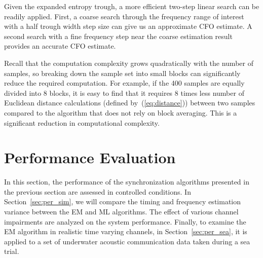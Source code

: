 \documentclass[journal,comsoc, onecolumn, 12pt,draftclsnofoot]{IEEEtran} %
\begin{document}
Given the expanded entropy trough, a more efficient two-step linear search can be readily applied.
First, a coarse search through the frequency range of interest with a half trough width step size can give us an approximate CFO estimate.
A second search with a fine frequency step near the coarse estimation result provides an accurate CFO estimate.

Recall that the computation complexity grows quadratically with the number of samples, so breaking down the sample set into small blocks can significantly reduce the required computation.
For example, if the 400 samples are equally divided into 8 blocks, it is easy to find that it requires 8 times less number of Euclidean distance calculations (defined by~(\ref{eq:distance})) between two samples compared to the algorithm that does not rely on block averaging. This is a significant reduction in computational complexity. 




\section{Performance Evaluation}
\label{sec:perfo}
In this section, the performance of the synchronization algorithms presented in the previous section are assessed in controlled conditions.
In Section~\ref{sec:per_sim}, we will compare the timing and frequency estimation variance between the EM and ML algorithms.
The effect of various channel impairments
are analyzed on the system performance.
Finally, to examine the EM algorithm in realistic time varying channels, in Section~\ref{sec:per_sea}, it is applied to a set of underwater acoustic communication data taken during a sea trial.
\end{document}
